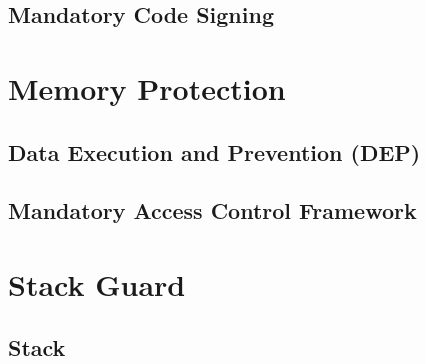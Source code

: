 \subsection{Mandatory Code Signing}
\label{sec:MandatoryCodeSigning}

\section{Memory Protection}
\label{sec:MemoryProtection}
\subsection{Data Execution and Prevention (DEP)}
\label{sec:DEP}
\subsection{Mandatory Access Control Framework}
\label{sec:MACF}

\section{Stack Guard}
\label{sec:StackGuard}
\subsection{Stack}
\label{sec:Stack}
